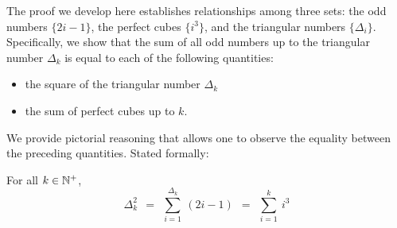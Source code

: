 \smallskip

The proof we develop here establishes relationships among three sets: the odd numbers $\{2i-1\}$, the perfect cubes $\{i^3\}$, and the triangular numbers $\{ \Delta_i \}$.  Specifically, we show that the sum of all odd numbers up to the triangular number $\Delta_k$ is equal to each of the following quantities:
\begin{itemize}
\item
the square of the triangular number $\Delta_k$
\item
the sum of perfect cubes up to $k$.
\end{itemize}
We provide pictorial reasoning that allows one to observe the equality between the preceding quantities.  Stated formally:

\begin{prop}
\label{thm:odds-sum2-cubes}
For all $k \in \mathbb{N}^+$,
\begin{equation}
\label{eq:sum-odds=Delta-sq=sum-cubes}
\Delta_k^2 \ \  = \ \
\sum_{i=1}^{\Delta_k} \ (2i-1)  \ \ =  \ \ \sum_{i=1}^k \ i^3
\end{equation}
\end{prop}

